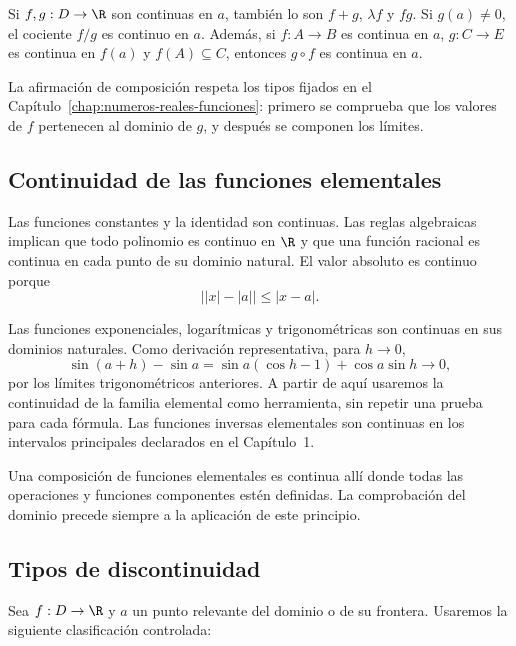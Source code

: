 \begin{teorema}
Si \(f,g:D\to\R\) son continuas en \(a\), también lo son
\(f+g\), \(\lambda f\) y \(fg\). Si \(g(a)\ne0\), el cociente \(f/g\) es
continuo en \(a\). Además, si \(f:A\to B\) es continua en \(a\),
\(g:C\to E\) es continua en \(f(a)\) y \(f(A)\subseteq C\), entonces
\(g\circ f\) es continua en \(a\).
\end{teorema}

La afirmación de composición respeta los tipos fijados en el
Capítulo~\ref{chap:numeros-reales-funciones}: primero se comprueba que los
valores de \(f\) pertenecen al dominio de \(g\), y después se componen los
límites.

\subsection{Continuidad de las funciones elementales}

Las funciones constantes y la identidad son continuas. Las reglas algebraicas
implican que todo polinomio es continuo en \(\R\) y que una función racional
es continua en cada punto de su dominio natural. El valor absoluto es continuo
porque
\[
  \bigl||x|-|a|\bigr|\le|x-a|.
\]

Las funciones exponenciales, logarítmicas y trigonométricas son continuas en
sus dominios naturales. Como derivación representativa, para \(h\to0\),
\[
 \sin(a+h)-\sin a
 =\sin a(\cos h-1)+\cos a\sin h\longrightarrow0,
\]
por los límites trigonométricos anteriores. A partir de aquí usaremos la
continuidad de la familia elemental como herramienta, sin repetir una prueba
para cada fórmula. Las funciones inversas elementales son continuas en los
intervalos principales declarados en el Capítulo~1.

Una composición de funciones elementales es continua allí donde todas las
operaciones y funciones componentes estén definidas. La comprobación del
dominio precede siempre a la aplicación de este principio.

\subsection{Tipos de discontinuidad}

Sea \(f:D\to\R\) y \(a\) un punto relevante del dominio o de su frontera.
Usaremos la siguiente clasificación controlada:

